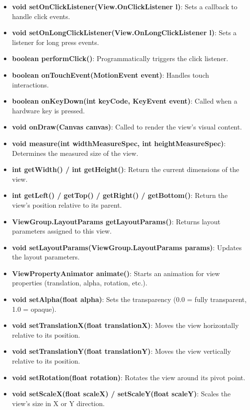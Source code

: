 \documentclass{report}
\begin{document}
\begin{itemize}
\begin{itemize}
                \item \textbf{void setOnClickListener(View.OnClickListener l)}: Sets a callback to handle click events.
                \item \textbf{void setOnLongClickListener(View.OnLongClickListener l)}: Sets a listener for long press events.
                \item \textbf{boolean performClick()}: Programmatically triggers the click listener.
                \item \textbf{boolean onTouchEvent(MotionEvent event)}: Handles touch interactions.
                \item \textbf{boolean onKeyDown(int keyCode, KeyEvent event)}: Called when a hardware key is pressed.
                \item \textbf{void onDraw(Canvas canvas)}: Called to render the view’s visual content.

                \item \textbf{void measure(int widthMeasureSpec, int heightMeasureSpec)}: Determines the measured size of the view.
                \item \textbf{int getWidth() / int getHeight()}: Return the current dimensions of the view.
                \item \textbf{int getLeft() / getTop() / getRight() / getBottom()}: Return the view’s position relative to its parent.
                \item \textbf{ViewGroup.LayoutParams getLayoutParams()}: Returns layout parameters assigned to this view.
                \item \textbf{void setLayoutParams(ViewGroup.LayoutParams params)}: Updates the layout parameters.

                \item \textbf{ViewPropertyAnimator animate()}: Starts an animation for view properties (translation, alpha, rotation, etc.).
                \item \textbf{void setAlpha(float alpha)}: Sets the transparency (0.0 = fully transparent, 1.0 = opaque).
                \item \textbf{void setTranslationX(float translationX)}: Moves the view horizontally relative to its position.
                \item \textbf{void setTranslationY(float translationY)}: Moves the view vertically relative to its position.
                \item \textbf{void setRotation(float rotation)}: Rotates the view around its pivot point.
                \item \textbf{void setScaleX(float scaleX) / setScaleY(float scaleY)}: Scales the view’s size in X or Y direction.


\end{itemize}
\end{itemize}
\end{document}
